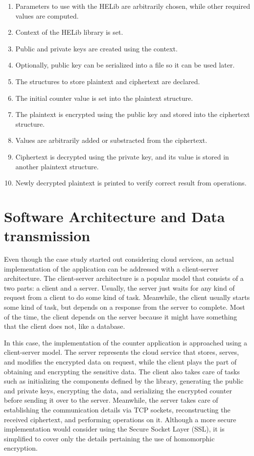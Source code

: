 \begin{enumerate}
	\item Parameters to use with the HELib are arbitrarily chosen, while other required values are computed.
	\item Context of the HELib library is set.	
	\item Public and private keys are created using the context.
	\item Optionally, public key can be serialized into a file so it can be used later.
	\item The structures to store plaintext and ciphertext are declared.
	\item The initial counter value is set into the plaintext structure.
	\item The plaintext is encrypted using the public key and stored into the ciphertext structure.
	\item Values are arbitrarily added or substracted from the ciphertext.
	\item Ciphertext is decrypted using the private key, and its value is stored in another plaintext structure.
	\item Newly decrypted plaintext is printed to verify correct result from operations.
\end{enumerate}

\section{{Software Architecture and Data transmission}}

Even though the case study started out considering cloud services, an actual implementation of the application can be addressed with a client-server architecture. The client-server architecture is a popular model that consists of a two parts: a client and a server. Usually, the server just waits for any kind of request from a client to do some kind of task. Meanwhile, the client usually starts some kind of task, but depends on a response from the server to complete. Most of the time, the client depends on the server because it might have something that the client does not, like a database.

In this case, the implementation of the counter application is approached using a client-server model. The server represents the cloud service that stores, serves, and modifies the encrypted data on request, while the client plays the part of obtaining and encrypting the sensitive data. The client also takes care of tasks such as initializing the components defined by the library, generating the public and private keys, encrypting the data, and serializing the encrypted counter before sending it over to the server. Meanwhile, the server takes care of establishing the communication details via TCP sockets, reconstructing the received ciphertext, and performing operations on it. Although a more secure implementation would consider using the Secure Socket Layer (SSL), it is simplified to cover only the details pertaining the use of homomorphic encryption.

